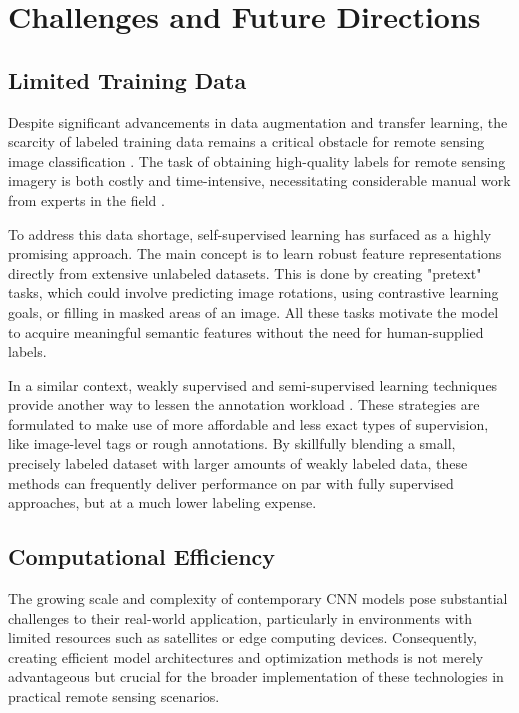 \documentclass[12pt,a4paper]{article}
\begin{document}
\section{Challenges and Future Directions}
\label{sec:challenges}

\subsection{Limited Training Data}
Despite significant advancements in data augmentation and transfer learning, the scarcity of labeled training data remains a critical obstacle for remote sensing image classification \cite{zhu2017deep}. The task of obtaining high-quality labels for remote sensing imagery is both costly and time-intensive, necessitating considerable manual work from experts in the field \cite{xia2017aid}.

To address this data shortage, self-supervised learning has surfaced as a highly promising approach. The main concept is to learn robust feature representations directly from extensive unlabeled datasets. This is done by creating "pretext" tasks, which could involve predicting image rotations, using contrastive learning goals, or filling in masked areas of an image. All these tasks motivate the model to acquire meaningful semantic features without the need for human-supplied labels.

In a similar context, weakly supervised and semi-supervised learning techniques provide another way to lessen the annotation workload \cite{zhang2016weakly}. These strategies are formulated to make use of more affordable and less exact types of supervision, like image-level tags or rough annotations. By skillfully blending a small, precisely labeled dataset with larger amounts of weakly labeled data, these methods can frequently deliver performance on par with fully supervised approaches, but at a much lower labeling expense.

\subsection{Computational Efficiency}
The growing scale and complexity of contemporary CNN models pose substantial challenges to their real-world application, particularly in environments with limited resources such as satellites or edge computing devices. Consequently, creating efficient model architectures and optimization methods is not merely advantageous but crucial for the broader implementation of these technologies in practical remote sensing scenarios.
\end{document}
